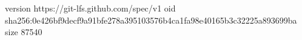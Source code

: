 version https://git-lfs.github.com/spec/v1
oid sha256:0e426bf9decf9a91bfe278a395103576b4ca1fa98e40165b3c32225a893699ba
size 87540
